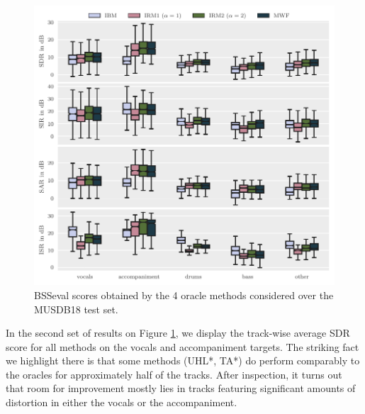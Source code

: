 \documentclass{llncs}
\begin{document}
\begin{figure}[ht]
  \begin{center}
     \includegraphics[width=\linewidth]{fig/oracle-evaluation.pdf}
     \vspace{-1cm}
  \end{center}
  \caption{BSSeval scores obtained by the 4 oracle methods considered over the MUSDB18 test set.}
  \label{fig:trackwise_scores}
\end{figure}

In the second set of results on Figure \ref{fig:trackwise_scores}, we display the track-wise average SDR score for all methods on the vocals and accompaniment targets. The striking fact we highlight there is that some methods (UHL*, TA*) do perform comparably to the oracles for approximately half of the tracks. After inspection, it turns out that room for improvement mostly lies in tracks featuring significant amounts of distortion in either the vocals or the accompaniment.
\end{document}
